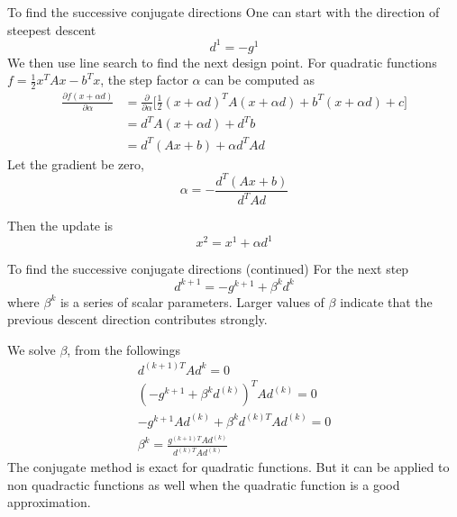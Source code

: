 \documentclass{beamer}
\begin{document}
\begin{frame}{To find the successive conjugate directions}
One can start with the direction of steepest descent
    \begin{equation*}
        d^1 = - g^1
    \end{equation*}
We then use line search to find the next design point. For quadratic functions $f= \frac{1}{2} x^T A x - b^T x $, the step factor $\alpha$ can be computed as
\begin{equation*}
\begin{split}
    \frac{\partial f(x+\alpha d)}{\partial \alpha} & = \frac{\partial}{\partial\alpha} \Bigg[\frac{1}{2} (x+\alpha d)^T A (x+\alpha d) + b^T (x+\alpha d) + c \Bigg]\\
    & = d^T A(x + \alpha d) + d^T b\\
    & = d^T(Ax + b) + \alpha d^T A d
\end{split}
\end{equation*}
Let the gradient be zero, 
\begin{equation*}
    \alpha = - \frac{d^T(Ax + b)}{d^T A d}
\end{equation*}

Then the update is
\begin{equation*}
    x^2 = x^1 + \alpha d^1
\end{equation*}

\end{frame}

\begin{frame}{To find the successive conjugate directions (continued)}
For the next step
    \begin{equation*}
        d^{k+1} = -g^{k+1} + \beta^k d^k
    \end{equation*}
where $\beta^k$ is a series of scalar parameters. Larger values of $\beta$ indicate that the previous descent direction contributes strongly.

We solve $\beta$, from the followings
\begin{gather*}
    d^{(k+1)T} A d^k = 0 \\
    (-g^{k+1} + \beta^k d^{(k)})^T A d^{(k)} = 0\\
    -g^{k+1}A d^{(k)} + \beta^k d^{(k)T} A d^{(k)} = 0 \\
    \beta^k = \frac{g^{(k+1)T}A d^{(k)}}{d^{(k)T}A d^{(k)}} 
\end{gather*}
The conjugate method is exact for quadratic functions. But it can be applied to non quadractic functions as well when the quadratic function is a good approximation.

\end{frame}
\end{document}
